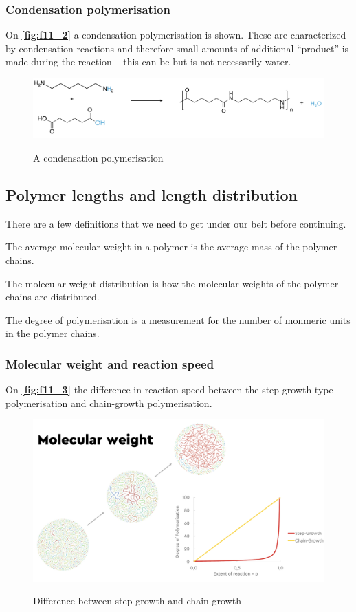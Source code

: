 \subsubsection{Condensation polymerisation}
On \textbf{\autoref{fig:f11_2}} a condensation polymerisation is shown. These are characterized by condensation reactions and therefore small amounts of additional ``product'' is made during the reaction -- this can be but is not necessarily water. 

\begin{figure} [ht]
  \centering
  \caption{A condensation polymerisation}
  \includegraphics[width=0.5\linewidth]{./figures/f11_2.png}
  \label{fig:f11_2}
\end{figure}

\subsection{Polymer lengths and length distribution}
There are a few definitions that we need to get under our belt before continuing.
\begin{definition}
  The average molecular weight in a polymer is the average mass of the polymer chains.
\end{definition}
\begin{definition}
  The molecular weight distribution is how the molecular weights of the polymer chains are distributed.
\end{definition}
\begin{definition}
  The degree of polymerisation is a measurement for the number of monmeric units in the polymer chains.
\end{definition}

\subsubsection{Molecular weight and reaction speed}
On \textbf{\autoref{fig:f11_3}} the difference in reaction speed between the step growth type polymerisation and chain-growth polymerisation.
\begin{figure} [ht]
  \centering
  \caption{Difference between step-growth and chain-growth}
  \includegraphics[width=0.75\linewidth]{./figures/f11_3.png}
  \label{fig:f11_3}
\end{figure}

